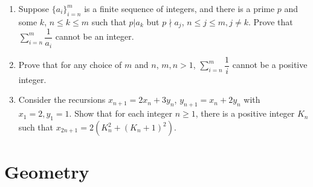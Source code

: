 \documentclass[12pt]{scrartcl}
\begin{document}
\begin{enumerate}[resume]
    \item Suppose $\{a_{i}\}_{i=n}^{m}$ is a finite sequence of integers, and there is a prime $p$ and some $k$, $n\le k\le m$ such that $p|a_{k}$ but $p \nmid a_{j}$, $n\le j\le m, j\ne k$. Prove that $\sum_{i=n}^{m}\dfrac{1}{a_{i}}$ cannot be an integer.

    \item Prove that for any choice of $m$ and $n$, $m, n>1$, $\sum_{i=n}^{m}\dfrac{1}{i}$ cannot be a positive integer.

    \item Consider the recursions $x_{n+1}=2x_{n}+3y_{n}$, $y_{n+1}=x_{n}+2y_{n}$ with $x_{1}=2, y_{1}=1$. Show that for each integer $n\ge1$, there is a positive integer $K_{n}$ such that $x_{2n+1}=2(K_{n}^{2}+(K_{n}+1)^{2})$.
\end{enumerate}


\section*{Geometry}
\end{document}
